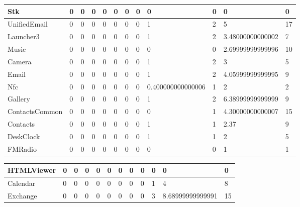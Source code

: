 \documentclass[a4paper]{article}
\begin{document}
\begin{tabular}{|l|l|l|l|l|l|l|l|l|l|l|l|}
\hline
Stk&0&0&0&0&0&0&0&0&0&0&0\\
\hline
UnifiedEmail&0&0&0&0&0&0&0&1&2&5&17\\
\hline
Launcher3&0&0&0&0&0&0&0&1&2&3.48000000000002&7\\
\hline
Music&0&0&0&0&0&0&0&0&0&2.69999999999996&10\\
\hline
Camera&0&0&0&0&0&0&0&1&2&3&5\\
\hline
Email&0&0&0&0&0&0&0&1&2&4.05999999999995&9\\
\hline
Nfc&0&0&0&0&0&0&0&0.400000000000006&1&2&2\\
\hline
Gallery&0&0&0&0&0&0&0&1&2&6.38999999999999&9\\
\hline
ContactsCommon&0&0&0&0&0&0&0&0&1&4.30000000000007&15\\
\hline
Contacts&0&0&0&0&0&0&0&1&1&2.37&9\\
\hline
DeskClock&0&0&0&0&0&0&0&1&1&2&5\\
\hline
FMRadio&0&0&0&0&0&0&0&0&0&1&1\\
\hline
\end{tabular}
\newline
\begin{tabular}{|l|l|l|l|l|l|l|l|l|l|l|l|}
\hline
HTMLViewer&0&0&0&0&0&0&0&0&0&0&0\\
\hline
Calendar&0&0&0&0&0&0&0&0&1&4&8\\
\hline
Exchange&0&0&0&0&0&0&0&0&3&8.68999999999991&15\\
\hline
\end{tabular}
\end{document}
